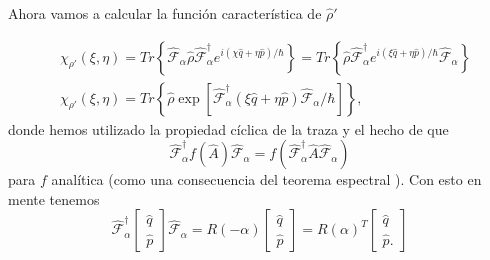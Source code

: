                 Ahora vamos a calcular la función característica de $\hat{\rho}'$

                \begin{align*}
                    & \chi_{\rho '} \left(\xi, \eta\right) = Tr \left\{\hat{\mathcal{F}}_\alpha \hat{\rho} \hat{\mathcal{F}}_\alpha ^\dagger e^{i \left(\chi\hat{q} + \eta \hat{p} \right)/\hbar} \right\} = Tr\left\{\hat{\rho} \hat{\mathcal{F}}_\alpha^\dagger e^{i\left(\xi \hat{q} + \eta \hat{p}  \right)/\hbar} \hat{\mathcal{F}}_\alpha \right\}\\
                    & \chi_{\rho '} \left(\xi, \eta\right) = Tr \left\{ \hat{\rho} \exp \left[\hat{\mathcal{F}}_\alpha^\dagger \left(\xi \hat{q} + \eta \hat{p} \right)\hat{\mathcal{F}}_\alpha / \hbar \right] \right\},
                \end{align*}
                donde hemos utilizado la propiedad cíclica de la traza y el hecho de que
                \begin{equation*}
                    \hat{\mathcal{F}}_\alpha^\dagger f(\hat{A}) \hat{\mathcal{F}}_\alpha = f\left( \hat{\mathcal{F}}^\dagger_\alpha \hat{A} \hat{\mathcal{F}}_\alpha \right)
                \end{equation*}
                para $f$ analítica (como una consecuencia del teorema espectral \cite{reed1980methods}). Con esto en mente tenemos
                \begin{equation*}
                    \hat{\mathcal{F}}_\alpha^\dagger
                    \begin{bmatrix}
                        \hat{q}\\
                        \hat{p}
                    \end{bmatrix}
                    \hat{\mathcal{F}}_\alpha
                    = R(-\alpha)
                    \begin{bmatrix}
                        \hat{q}\\
                        \hat{p}
                    \end{bmatrix}
                    = R(\alpha)^T
                    \begin{bmatrix}
                        \hat{q}\\
                        \hat{p}.
                    \end{bmatrix}
                \end{equation*}

